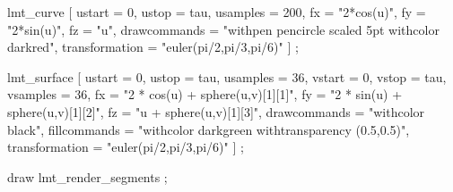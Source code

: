 \startMPpage[offset=1ex]
    lmt_curve [
        ustart          = 0,
        ustop           = tau,
        usamples        = 200,
        fx              = "2*cos(u)",
        fy              = "2*sin(u)",
        fz              = "u",
        drawcommands    = "withpen pencircle scaled 5pt withcolor darkred",
        transformation  = "euler(pi/2,pi/3,pi/6)"
    ] ;

    lmt_surface [
        ustart          = 0,
        ustop           = tau,
        usamples        = 36,
        vstart          = 0,
        vstop           = tau,
        vsamples        = 36,
        fx              = "2 * cos(u) + sphere(u,v)[1][1]",
        fy              = "2 * sin(u) + sphere(u,v)[1][2]",
        fz              = "u + sphere(u,v)[1][3]",
        drawcommands    = "withcolor black",
        fillcommands    = "withcolor darkgreen withtransparency (0.5,0.5)",
        transformation  = "euler(pi/2,pi/3,pi/6)"
    ] ;

    draw lmt_render_segments ;
\stopMPpage